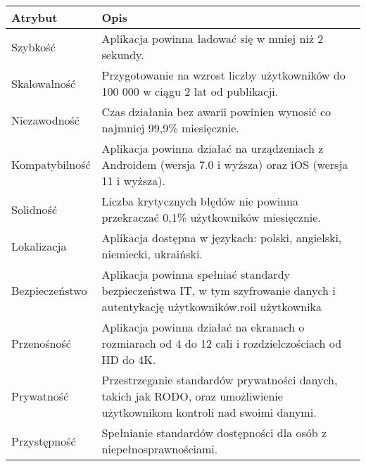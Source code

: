 \begin{table}[h]
  \begin{tabular}{|p{3cm}|p{\dimexpr\textwidth-3cm\relax}|} \hline
    \textbf{Atrybut} & \textbf{Opis} \\\hline
    Szybkość & Aplikacja powinna ładować się w mniej niż 2 sekundy. \\\hline
    Skalowalność & Przygotowanie na wzrost liczby użytkowników do 100 000 w ciągu 2 lat od publikacji. \\\hline
    Niezawodność & Czas działania bez awarii powinien wynosić co najmniej 99,9\% miesięcznie. \\\hline
    Kompatybilność & Aplikacja powinna działać na urządzeniach z Androidem (wersja 7.0 i wyższa) oraz iOS (wersja 11 i wyższa). \\\hline
    Solidność & Liczba krytycznych błędów nie powinna przekraczać 0,1\% użytkowników miesięcznie. \\\hline
    Lokalizacja & Aplikacja dostępna w językach: polski, angielski, niemiecki, ukraiński. \\\hline
    Bezpieczeństwo & Aplikacja powinna spełniać standardy bezpieczeństwa IT, w tym szyfrowanie danych i autentykację użytkowników.roil użytkownika \\\hline
    Przenośność & Aplikacja powinna działać na ekranach o rozmiarach od 4 do 12 cali i rozdzielczościach od HD do 4K. \\\hline
    Prywatność & Przestrzeganie standardów prywatności danych, takich jak RODO, oraz umożliwienie użytkownikom kontroli nad swoimi danymi. \\\hline
    Przystępność & Spełnianie standardów dostępności dla osób z niepełnosprawnościami. \\\hline
  \end{tabular}
\end{table}

